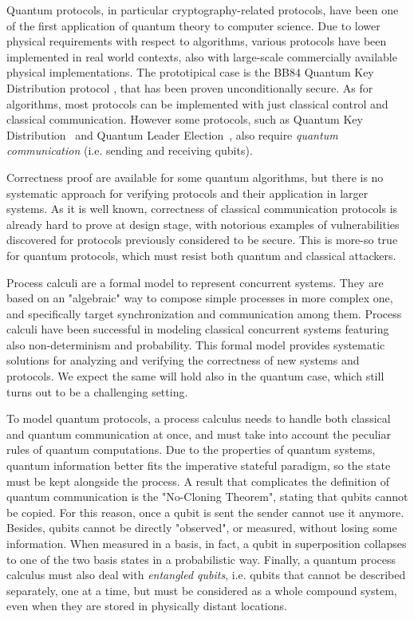 Quantum protocols, in particular cryptography-related protocols, have been  one of the first application 
of quantum theory to computer science. Due to lower physical
requirements with respect to algorithms, various protocols have been implemented
in real world contexts, also with large-scale commercially available physical implementations.
The prototipical case is the BB84 Quantum Key Distribution
protocol \cite{shor_simple_2000}, that has been proven unconditionally secure. As for algorithms, most protocols can be implemented with just classical control and classical communication. However some protocols, such as Quantum Key
Distribution~\cite{poppe_practical_2004} and Quantum Leader
Election~\cite{tani_exact_2012}, also require \textit{quantum communication} (i.e. sending and receiving qubits).


Correctness proof are available for some quantum algorithms, but there is no systematic approach for verifying protocols and their application in larger systems.
As it is well known, correctness of classical communication protocols is already hard to prove at design stage, with notorious examples of vulnerabilities discovered for protocols previously considered to be secure. This is more-so true for quantum protocols, which must resist both quantum and classical attackers.


Process calculi are a formal model to represent concurrent systems. They are based on an "algebraic" way to compose simple processes in more complex one, and specifically target synchronization and communication among them.
Process calculi have been successful in modeling classical concurrent systems featuring also non-determinism and probability. This formal model provides systematic solutions for analyzing and verifying the correctness of new systems and protocols. We expect the same will hold also in the quantum case, which still turns out to be a challenging setting.


To model quantum protocols, a process calculus needs to handle both classical and quantum communication at once, and must take into account the peculiar rules of quantum computations. Due to the properties of quantum systems, quantum information better fits the imperative stateful paradigm, so the state must be kept alongside the process. A result that complicates the definition of quantum communication is the "No-Cloning Theorem", stating that qubits cannot be copied. For this reason, once a qubit is sent the sender cannot use it anymore.
Besides, qubits cannot be directly "observed", or measured, without losing some information. When measured in a basis, in fact, a qubit in superposition collapses to one of the two basis states in a probabilistic way.
Finally, a quantum process calculus must also deal with \textit{entangled qubits}, i.e. qubits that cannot be described separately, one at a time, but must be considered as a whole compound system, even when they are stored in physically distant locations.

